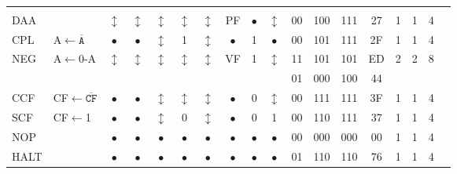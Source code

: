 \documentclass[oneside,a4paper]{book}
\begin{document}
{\tt \scriptsize \setlength{\fboxsep}{0.25mm}
	\setlength{\tabcolsep}{1mm}
	\begin{tabular}{llcccccccccccccccl}
		     
		\instrheader

	& & & & & & & & & & & & & & & & & \\

		DAA\instrt & & 
			$\updownarrow$ & 
				$\updownarrow$ & 
				$\updownarrow$ & 
				$\updownarrow$ & 
				$\updownarrow$ & 
				PF & 
				$\bullet$ & 
				$\updownarrow$ &
			00 & 100 & 111 & 
			27 & 1 & 
			1 & 4 & \instrb \\

		CPL\instrt & 
			A$\leftarrow\mathtt{\overline{A}}$ & 
			$\bullet$ & 
				$\bullet$ & 
				$\updownarrow$ & 
				1 & 
				$\updownarrow$ & 
				$\bullet$ & 
				1 & 
				$\bullet$ & 
			00 & 101 & 111 & 
			2F & 1 & 
			1 & 4 & \instrb \\

		NEG\instrt & 
			A$\leftarrow$0-A & 
			$\updownarrow$ & 
				$\updownarrow$ & 
				$\updownarrow$ & 
				$\updownarrow$ & 
				$\updownarrow$ & 
				VF & 
				1 & 
				$\updownarrow$ &
			11 & 101 & 101 & 
			ED & 2 & 
			2 & 8 & \\
		\multicolumn{10}{c}{} & 01 & 000 & 100 & 44 & \instrb \\

		CCF\instrt & 
			CF$\leftarrow\mathtt{\overline{CF}}$ & 
			$\bullet$ & 
				$\bullet$ & 
				$\updownarrow$\footnotemark[1] & 
				$\updownarrow$\footnotemark[2] & 
				$\updownarrow$\footnotemark[1] & 
				$\bullet$ & 
				0 & 
				$\updownarrow$ & 
			00 & 111 & 111 & 
			3F & 1 & 
			1 & 4 & \instrb \\

		SCF\instrt & 
			CF$\leftarrow$1 & 
			$\bullet$ & 
				$\bullet$ & 
				$\updownarrow$\footnotemark[1] & 
				0 & 
				$\updownarrow$\footnotemark[1] &
				 $\bullet$ & 
				 0 & 
				 1 & 
			00 & 110 & 111 & 
			37 & 1 & 
			1 & 4 & \instrb \\

		NOP\instrt & & 
			$\bullet$ & 
				$\bullet$ & 
				$\bullet$ & 
				$\bullet$ & 
				$\bullet$ & 
				$\bullet$ & 
				$\bullet$ & 
				$\bullet$ &
			00 & 000 & 000 & 
			00 & 1 & 
			1 & 4 & \instrb \\

		HALT\instrt & & 
			$\bullet$ & 
				$\bullet$ & 
				$\bullet$ & 
				$\bullet$ & 
				$\bullet$ & 
				$\bullet$ & 
				$\bullet$ & 
				$\bullet$ &
			01 & 110 & 110 & 
			76 & 1 & 
			1 & 4 & \instrb \\


\end{tabular}}
\end{document}
